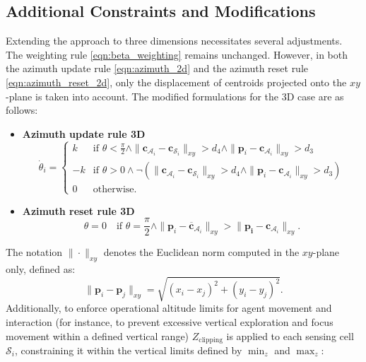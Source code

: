     \subsection{Additional Constraints and Modifications}
        Extending the approach to three dimensions necessitates several adjustments.
        The weighting rule \eqref{eqn:beta_weighting} remains unchanged. 
        However, in both the azimuth update rule \eqref{eqn:azimuth_2d} and the azimuth reset rule \eqref{eqn:azimuth_reset_2d}, only the displacement of centroids projected onto the $xy$-plane is taken into account.
        The modified formulations for the 3D case are as follows:
        \begin{itemize}
            \item \textbf{Azimuth update rule 3D}
                \begin{equation}
                    \label{eqn:azimuth_3d}
                    \dot{\theta}_i = 
                    \begin{cases}
                        k  & \text{if } \theta < \frac{\pi}{2} \land \|\mathbf{c}_{\mathcal{A}_i} - \mathbf{c}_{\mathcal{S}_i}\|_{xy} > d_4 \land \|\mathbf{p}_i - \mathbf{c}_{\mathcal{A}_i}\|_{xy} > d_3 \\
                        -k & \text{if } \theta > 0 \land \neg (\|\mathbf{c}_{\mathcal{A}_i} - \mathbf{c}_{\mathcal{S}_i}\|_{xy} > d_4 \land \|\mathbf{p}_i - \mathbf{c}_{\mathcal{A}_i}\|_{xy} > d_3) \\
                        0  & \text{otherwise} \text{.}
                    \end{cases}
                \end{equation}
            \item \textbf{Azimuth reset rule 3D}
                \begin{equation}
                    \label{eqn:azimuth_reset_3d}
                    \theta = 0 \quad \text{if } \theta = \frac{\pi}{2} \land \| \mathbf{p}_i - \mathbf{\overline{c}}_{\mathcal{A}_i} \|_{xy} > \| \mathbf{p_i} - \mathbf{c}_{\mathcal{A}_i} \|_{xy} \text{.}
                \end{equation}
        \end{itemize}

        The notation $\| \cdot \|_{xy}$ denotes the Euclidean norm computed in the $xy$-plane only, defined as:
        \begin{equation}
            \| \mathbf{p}_i - \mathbf{p}_j \|_{xy} = \sqrt{(x_i - x_j)^2 + (y_i - y_j)^2}\text{.}
        \end{equation}
        Additionally, to enforce operational altitude limits for agent movement and interaction (for instance, to prevent excessive vertical exploration and focus movement within a defined vertical range) $Z_{\text{clipping}}$ is applied to each sensing cell $\mathcal{S}_i$, constraining it within the vertical limits defined by $\min_z$ and $\max_z$:

